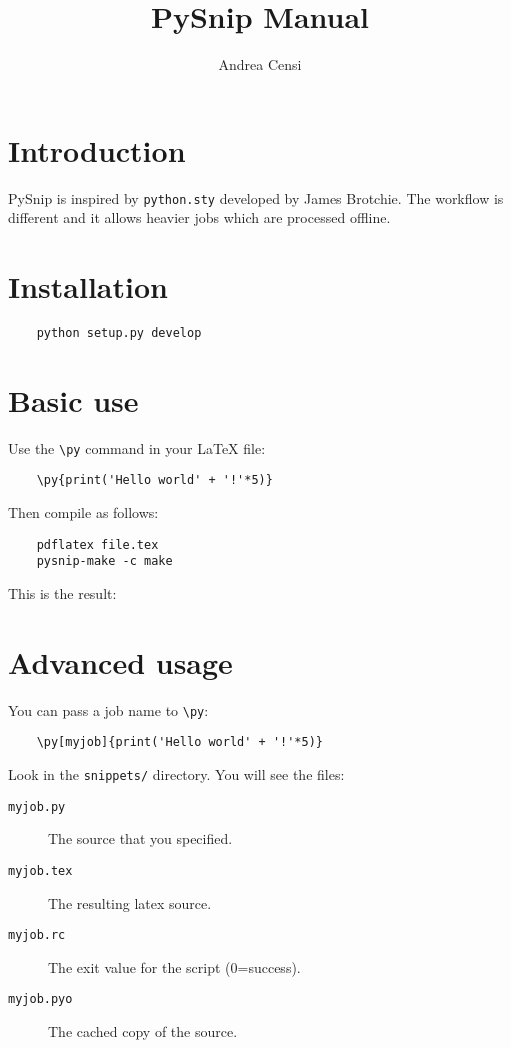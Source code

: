 \documentclass{article}
\title{ PySnip Manual}
\author{Andrea Censi}
\newcommand{\cmd}[1]{\texttt{\textbackslash #1}}
\begin{document}
  \maketitle


  \section{Introduction}

  PySnip is inspired by \texttt{python.sty} developed by James Brotchie.
  The workflow is different and it allows heavier jobs which are processed
  offline.


  \section{Installation}

  \begin{verbatim}
    python setup.py develop
  \end{verbatim}


  \section{Basic use}

  Use the \cmd{py} command in your LaTeX file:
  \begin{verbatim}
    \py{print('Hello world' + '!'*5)}
  \end{verbatim}

  Then compile as follows:
  \begin{verbatim}
    pdflatex file.tex
    pysnip-make -c make
  \end{verbatim}

  This is the result:
  \begin{quote}
  \end{quote}


  \section{Advanced usage}

  You can pass a job name to \cmd{py}:
  \begin{verbatim}
    \py[myjob]{print('Hello world' + '!'*5)}
  \end{verbatim}

  Look in the \texttt{snippets/} directory. You will see the files:

  \begin{description}
    \item[\texttt{myjob.py}] The source that you specified.
    \item[\texttt{myjob.tex}] The resulting latex source.
    \item[\texttt{myjob.rc}] The exit value for the script (0=success).
    \item[\texttt{myjob.pyo}]  The cached copy of the source.
  \end{description}
\end{document}
